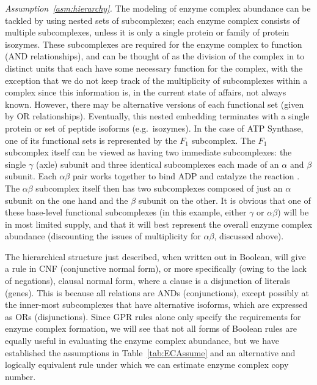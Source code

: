 \emph{Assumption~\ref{asm:hierarchy}.}
The modeling of enzyme complex abundance can be tackled by using
nested sets of subcomplexes; each enzyme complex consists of multiple
subcomplexes, unless it is only a single protein or family of protein
isozymes.  These subcomplexes are required for the enzyme complex to
function (AND relationships), and can be thought of as the division of
the complex in to distinct units that each have some necessary
function for the complex, with the exception that we do not keep track
of the multiplicity of subcomplexes within a complex since this
information is, in the current state of affairs, not always known.
However, there may be alternative versions of each functional set
(given by OR relationships). Eventually, this nested embedding
terminates with a single protein or set of peptide isoforms
(e.g.\ isozymes).  In the case of ATP Synthase, one of its functional
sets is represented by the $F_1$ subcomplex. The $F_1$ subcomplex
itself can be viewed as having two immediate subcomplexes: the single
$\gamma$ (axle) subunit and three identical subcomplexes each made of
an $\alpha$ and $\beta$ subunit. Each $\alpha\beta$ pair works
together to bind ADP and catalyze the reaction \citep{Oster2003}. The
$\alpha\beta$ subcomplex itself then has two subcomplexes composed of
just an $\alpha$ subunit on the one hand and the $\beta$ subunit on
the other.  It is obvious that one of these base-level functional
subcomplexes (in this example, either $\gamma$ or $\alpha\beta$) will
be in most limited supply, and that it will best represent the overall
enzyme complex abundance (discounting the issues of multiplicity for
$\alpha\beta$, discussed above).

%
%

The hierarchical structure just described, when written out in
Boolean, will give a rule in CNF (conjunctive normal form), or more
specifically (owing to the lack of negations), clausal normal form,
where a clause is a disjunction of literals (genes). This is because all
relations are ANDs (conjunctions), except possibly at the inner-most
subcomplexes that have alternative isoforms, which are expressed as
ORs (disjunctions). Since GPR rules alone only specify the
requirements for enzyme complex formation, we will see that not all
forms of Boolean rules are equally useful in evaluating the enzyme
complex abundance, but we have established the assumptions in \suppOrApp
Table~\ref{tab:ECAssume} and an alternative and logically equivalent rule
\citep{Russell2009} under which we can estimate enzyme complex copy
number.

